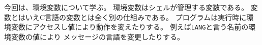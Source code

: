 \documentclass[a4j,dvipdfmx]{jarticle}
\begin{document}
\def\lstlistingname{リスト}


今回は、環境変数について学ぶ。
環境変数はシェルが管理する変数である。
変数とはいえC言語の変数とは全く別の仕組みである。
プログラムは実行時に環境変数にアクセスし値により動作を変えたりする。
例えば\verb/LANG/と言う名前の環境変数の値により
メッセージの言語を変更したりする。
\end{document}
